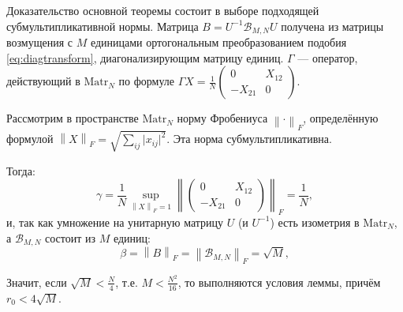 Доказательство основной теоремы
состоит в выборе подходящей субмультипликативной нормы.
Матрица \( B = U^{-1} \mathscr{B}_{M,N} U \)
получена из матрицы возмущения с \( M \) единицами
ортогональным преобразованием подобия \eqref{eq:diagtransform},
диагонализирующим матрицу единиц.
\( \Gamma \) --- оператор, действующий в \( \mathrm{Matr}_{N} \)
по формуле
\( { \Gamma X = \frac1N \begin{pmatrix}0 & X_{12} \\ -X_{21} & 0\end{pmatrix} } \).

Рассмотрим в пространстве \( \mathrm{Matr}_{N} \)
норму Фробениуса \( {\left\|\cdot\right\|}_{F} \),
определённую формулой
\( {\left\|X\right\|}_{F} = \sqrt{\sum_{ij} \lvert x_{ij}\rvert^2}. \)
Эта норма субмультипликативна.

Тогда:
\[ \gamma = \frac1N
            \sup_{{\left\|X\right\|}_{F}=1}{\left\|\begin{pmatrix}0 & X_{12} \\ -X_{21} & 0\end{pmatrix}\right\|}_{F}
          = \frac1N,
    \]
и, так как умножение на унитарную матрицу \( U \)
    (и \( U^{-1} \)) есть изометрия в \( \mathrm{Matr}_{N} \),
    а \( \mathscr{B}_{M,N} \) состоит из \( M \) единиц:
\[
    \beta = {\left\|B\right\|}_{F} =
    {\left\|\mathscr{B}_{M,N}\right\|}_{F} = \sqrt{M},
    \]

Значит, если
\( \sqrt{M} < \frac{N}{4} \), т.е.
\( M < \frac{N^2}{16} \),
то выполняются условия леммы,
причём \( r_0 < 4\sqrt{M} \).
